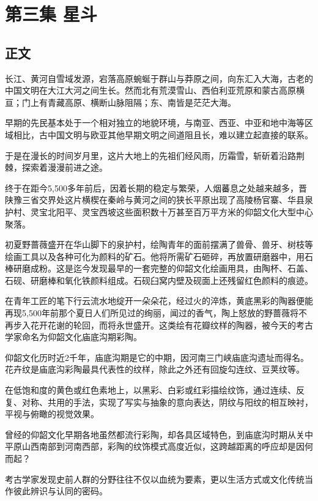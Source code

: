 \chapter{第三集 \quad 星斗}


\section{正文}


长江、黄河自雪域发源，宕落高原蜿蜒于群山与莽原之间，向东汇入大海，古老的中国文明在大江大河之间生长。然而北有荒漠雪山、西伯利亚荒原和蒙古高原横亘；门上有青藏高原、横断山脉阻隔；东、南皆是茫茫大海。

早期的先民基本处于一个相对独立的地貌环境，与南亚、西亚、中亚和地中海等区域相比，古中国文明与欧亚其他早期文明之间道阻且长，难以建立起直接的联系。

于是在漫长的时间岁月里，这片大地上的先祖们经风雨，历霜雪，斩斫着沿路荆棘，探索着漫漫前进之途。

终于在距今5,500多年前后，因着长期的稳定与繁荣，人烟蕃息之处越来越多，晋陕豫三省交界处这片横楔在秦岭与黄河之间的狭长平原出现了高陵杨官寨、华县泉护村、灵宝北阳平、灵宝西坡这些面积数十万甚至百万平方米的仰韶文化大型中心聚落。

初夏野蔷薇盛开在华山脚下的泉护村，绘陶青年的面前摆满了兽骨、兽牙、树枝等绘画工具以及各种可化为颜料的矿石。他将所需矿石砸碎，再放置研磨器中，用石棒研磨成粉。这是迄今发现最早的一套完整的仰韶文化绘画用具，由陶杯、石盖、石砚、研磨棒和氧化铁颜料组成。石砚臼窝内壁及砚面上还残留红色颜料的痕迹。

在青年工匠的笔下行云流水地绽开一朵朵花，经过火的淬炼，黄底黑彩的陶器便能再现5,500年前那个夏日人们所见过的绚丽，闻过的香气，陶上怒放的野蔷薇将不再步入花开花谢的轮回，而将永世盛开。这类绘有花瓣纹样的陶器，被今天的考古学家命名为仰韶文化庙底沟期彩陶。

仰韶文化历时近2千年，庙底沟期是它的中期，因河南三门峡庙底沟遗址而得名。花卉纹是庙底沟彩陶最具代表性的纹样，除此之外还有回旋勾连纹、豆荚纹等。

在低饱和度的黄色或红色素地上，以黑彩、白彩或红彩描绘纹饰，通过连续、反复、对称、共用的手法，实现了写实与抽象的意向表达，阴纹与阳纹的相互映衬，平视与俯瞰的视觉效果。

曾经的仰韶文化早期各地虽然都流行彩陶，却各具区域特色，到庙底沟时期从关中平原山西南部到河南西部，彩陶的纹饰模式高度近似，这跨越距离的呼应却是因何而起？

考古学家发现史前人群的分野往往不仅以血统为要素，更以生活方式或文化传统当作彼此辨识与认同的密码。

